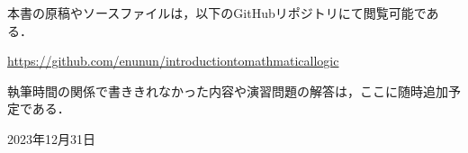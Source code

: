 本書の原稿やソースファイルは，以下のGitHubリポジトリにて閲覧可能である．

\begin{center}
	\url{https://github.com/enunun/introductiontomathmaticallogic}
\end{center}

執筆時間の関係で書ききれなかった内容や演習問題の解答は，ここに随時追加予定である．

\begin{flushright}
	2023年12月31日
\end{flushright}
